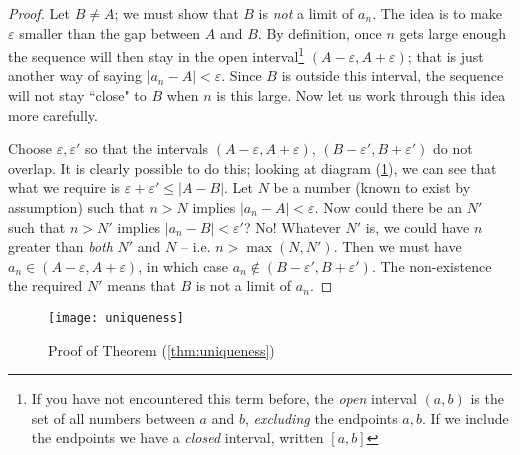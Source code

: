 \begin{proof}
Let $B\neq A$; we must show that $B$ is \emph{not} a limit of $a_n$. The idea is to make $\varepsilon$ smaller than the gap between $A$ and $B$. By definition, once $n$ gets large enough the sequence will then stay in the open  interval\footnote{If you have not encountered this term before, the \emph{open} interval $(a,b)$ is the set of all numbers between $a$ and $b$, \emph{excluding} the endpoints $a,b$. If we include the endpoints we have a \emph{closed } interval, written $[a,b]$} $(A-\varepsilon,A+\varepsilon)$; that is just another way of saying $|a_n-A|<\varepsilon$. Since $B$ is outside this interval, the sequence will not stay ``close" to $B$ when $n$ is this large. Now let us work through this idea more carefully. 

Choose $\varepsilon, \varepsilon'$ so that the intervals $(A-\varepsilon,A+\varepsilon)$,   $(B-\varepsilon',B+\varepsilon')$ do not overlap. It is clearly possible to do this; looking at diagram (\ref{fig:uniqueness}), we can see that what we require is $\varepsilon+\varepsilon' \leq |A-B|$.  Let $N$ be a number (known to exist by assumption) such that $n>N$ implies $|a_n-A|<\varepsilon$.  Now could there be an $N'$ such that $n>N'$ implies $|a_n-B|<\varepsilon'$? No! Whatever $N'$ is, we could have $n$ greater than \emph{both} $N'$ and $N$ -- i.e. $n>\max(N,N')$. Then we must have  $a_n \in (A-\varepsilon,A+\varepsilon)$, in which case $a_n \not\in (B-\varepsilon',B+\varepsilon')$. The non-existence the required $N'$ means that $B$ is not a limit of $a_n$.
\end{proof}

\begin{figure}
\begin{center}
\texttt{[image: uniqueness]}
\end{center}
\caption{Proof of Theorem (\ref{thm:uniqueness})\label{fig:uniqueness}}
\end{figure}

